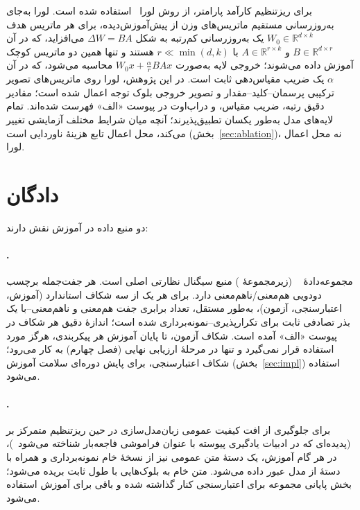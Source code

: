 برای ریزتنظیم کارآمد پارامتر، از روش
لورا~\cite{hu2021lora}
استفاده شده است. لورا به‌جای به‌روزرسانی مستقیم ماتریس‌های وزن از پیش‌آموزش‌دیده، برای هر ماتریس هدف
$W_0 \in \mathbb{R}^{d \times k}$
یک به‌روزرسانی کم‌رتبه به شکل
$\Delta W = BA$
می‌افزاید، که در آن
$B \in \mathbb{R}^{d \times r}$
و
$A \in \mathbb{R}^{r \times k}$
با
$r \ll \min(d,k)$
هستند و تنها همین دو ماتریس کوچک آموزش داده می‌شوند؛ خروجی لایه به‌صورت
$W_0 x + \frac{\alpha}{r}BAx$
محاسبه می‌شود، که در آن
$\alpha$
یک ضریب مقیاس‌دهی ثابت است. در این پژوهش، لورا روی ماتریس‌های تصویر ترکیبی پرسمان--کلید--مقدار و تصویر خروجی بلوک توجه اعمال شده است؛ مقادیر دقیق رتبه، ضریب مقیاس، و دراپ‌اوت در پیوست «الف» فهرست شده‌اند. تمام لایه‌های مدل به‌طور یکسان تطبیق‌پذیرند؛ آنچه میان شرایط مختلف آزمایشی تغییر می‌کند، محل اعمال تابع هزینهٔ ناوردایی است (بخش~\ref{sec:ablation})، نه محل اعمال لورا.

\section{دادگان}
\label{sec:data}
دو منبع داده در آموزش نقش دارند:

\paragraph{.}
مجموعه‌دادهٔ
~\cite{zhang2019paws}
(زیرمجموعهٔ
)
منبع سیگنال نظارتی اصلی است. هر جفت‌جمله برچسب دودویی هم‌معنی/ناهم‌معنی دارد. برای هر یک از سه شکاف استاندارد (آموزش، اعتبارسنجی، آزمون)، به‌طور مستقل، تعداد برابری جفت هم‌معنی و ناهم‌معنی--با یک بذر تصادفی ثابت برای تکرارپذیری--نمونه‌برداری شده است؛ اندازهٔ دقیق هر شکاف در پیوست «الف» آمده است. شکاف آزمون، تا پایان آموزش هر پیکربندی، هرگز مورد استفاده قرار نمی‌گیرد و تنها در مرحلهٔ ارزیابی نهایی (فصل چهارم) به کار می‌رود؛ شکاف اعتبارسنجی، برای پایش دوره‌ای سلامت آموزش (بخش~\ref{sec:impl}) استفاده می‌شود.

\paragraph{.}
برای جلوگیری از افت کیفیت عمومی زبان‌مدل‌سازی در حین ریزتنظیم متمرکز بر
(پدیده‌ای که در ادبیات یادگیری پیوسته با عنوان فراموشی فاجعه‌بار
شناخته می‌شود~\cite{kirkpatrick2017ewc})، در هر گام آموزش، یک دستهٔ متن عمومی نیز از نسخهٔ خام
نمونه‌برداری و همراه با دستهٔ
از مدل عبور داده می‌شود. متن خام به بلوک‌هایی با طول ثابت بریده می‌شود؛ بخش پایانی مجموعه برای اعتبارسنجی کنار گذاشته شده و باقی برای آموزش استفاده می‌شود.

